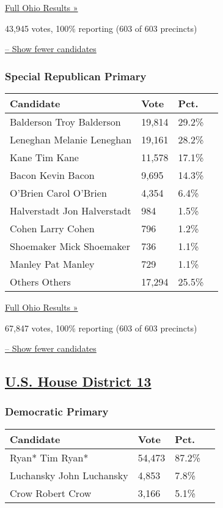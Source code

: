 \href{https://www.nytimes3xbfgragh.onion/elections/results/ohio}{Full
Ohio Results »}

43,945 votes, 100\% reporting (603 of 603 precincts)

\protect\hyperlink{}{-- Show fewer candidates}

\hypertarget{special-republican-primary}{%
\subsubsection{Special Republican
Primary}\label{special-republican-primary}}

\begin{longtable}[]{@{}llll@{}}
\toprule
Candidate & Vote & Pct. &\tabularnewline
\midrule
\endhead
 Balderson Troy Balderson & 19,814 & 29.2\% &\tabularnewline
 Leneghan Melanie Leneghan & 19,161 & 28.2\% &\tabularnewline
 Kane Tim Kane & 11,578 & 17.1\% &\tabularnewline
 Bacon Kevin Bacon & 9,695 & 14.3\% &\tabularnewline
 O'Brien Carol O'Brien & 4,354 & 6.4\% &\tabularnewline
 Halverstadt Jon Halverstadt & 984 & 1.5\% &\tabularnewline
 Cohen Larry Cohen & 796 & 1.2\% &\tabularnewline
 Shoemaker Mick Shoemaker & 736 & 1.1\% &\tabularnewline
 Manley Pat Manley & 729 & 1.1\% &\tabularnewline
 Others Others & 17,294 & 25.5\% &\tabularnewline
\bottomrule
\end{longtable}

\href{https://www.nytimes3xbfgragh.onion/elections/results/ohio}{Full
Ohio Results »}

67,847 votes, 100\% reporting (603 of 603 precincts)

\protect\hyperlink{}{-- Show fewer candidates}

\hypertarget{us-house-district-13}{%
\subsection{\texorpdfstring{\href{https://www.nytimes3xbfgragh.onion/elections/results/ohio-house-district-13-primary-election}{U.S.
House District
13}}{U.S. House District 13}}\label{us-house-district-13}}

\hypertarget{democratic-primary-14}{%
\subsubsection{Democratic Primary}\label{democratic-primary-14}}

\begin{longtable}[]{@{}llll@{}}
\toprule
Candidate & Vote & Pct. &\tabularnewline
\midrule
\endhead
 Ryan* Tim Ryan* & 54,473 & 87.2\% &\tabularnewline
 Luchansky John Luchansky & 4,853 & 7.8\% &\tabularnewline
 Crow Robert Crow & 3,166 & 5.1\% &\tabularnewline
\bottomrule
\end{longtable}

